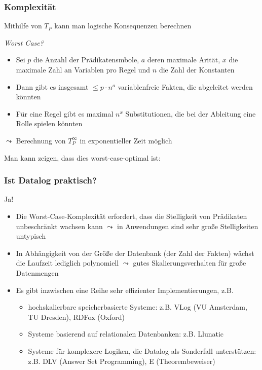 \documentclass[aspectratio=1610,onlymath]{beamer}
\begin{document}
\begin{frame}\frametitle{Komplexität}

Mithilfe von $T_P$ kann man logische Konsequenzen berechnen\\
\bigskip\pause

\emph{Worst Case?}
\begin{itemize}
\item Sei $p$ die Anzahl der Prädikatensmbole, $a$ deren maximale Arität, $x$ die maximale Zahl an Variablen pro Regel und $n$ die Zahl der Konstanten
\item Dann gibt es insgesamt $\leq p\cdot n^a$ variablenfreie Fakten, die abgeleitet werden könnten
\item Für eine Regel gibt es maximal $n^x$ Substitutionen, die bei der Ableitung eine Rolle spielen könnten
\end{itemize}\pause
$\leadsto$ Berechnung von $T_P^\infty$ in exponentieller Zeit möglich
\bigskip\pause

Man kann zeigen, dass dies worst-case-optimal ist:\medskip


\end{frame}

\begin{frame}\frametitle{Ist Datalog praktisch?}

\pause\bigskip

\alert{Ja!}
\begin{itemize}
\item Die Worst-Case-Komplexität erfordert, dass die Stelligkeit von Prädikaten unbeschränkt wachsen kann $\leadsto$ in Anwendungen sind sehr große Stelligkeiten untypisch
\item In Abhängigkeit von der Größe der Datenbank (der Zahl der Fakten) wächst die Laufzeit lediglich polynomiell $\leadsto$ gutes Skalierungsverhalten für große Datenmengen
\item Es gibt inzwischen eine Reihe sehr effizienter Implementierungen, z.B.
\begin{itemize}
\item hochskalierbare speicherbasierte Systeme: z.B. VLog (VU Amsterdam, TU Dresden), RDFox (Oxford)
\item Systeme basierend auf relationalen Datenbanken: z.B. Llunatic
\item Systeme für komplexere Logiken, die Datalog als Sonderfall unterstützen: z.B. DLV (Answer Set Programming), E (Theorembeweiser)
\end{itemize}
\end{itemize}

\end{frame}
\end{document}
